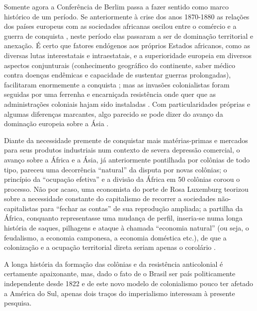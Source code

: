 Somente agora a Conferência de Berlim passa a fazer sentido como marco histórico de um período. Se anteriormente à crise dos anos 1870-1880 as relações dos países europeus com as sociedades africanas oscilou entre o comércio e a guerra de conquista \cite{ogot_hisaf5_2010,AJAYI2010}, neste período elas passaram a ser de dominação territorial e anexação. É certo que fatores endógenos aos próprios Estados africanos, como as diversas lutas interestatais e intraestatais, e a superioridade europeia em diversos aspectos conjunturais (conhecimento geográfico do continente, saber médico contra doenças endêmicas e capacidade de sustentar guerras prolongadas), facilitaram enormemente a conquista \cite{uzoigwe_partilha_2010}; mas as invasões colonialistas foram seguidas por uma ferrenha e encarniçada resistência onde quer que as administrações coloniais hajam sido instaladas \cite[p.~51-318]{boahen_hisaf7_2010}. Com particularidades próprias e algumas diferenças marcantes, algo parecido se pode dizer do avanço da dominação europeia sobre a Ásia \cite{panikkar_domasia_1977}. 

Diante da necessidade premente de conquistar mais matérias-primas e mercados para seus produtos industriais num contexto de severa depressão comercial, o avanço sobre a África e a Ásia, já anteriormente pontilhada por colônias de todo tipo, pareceu uma decorrência ``natural'' da disputa por novas colônias; o princípio da ``ocupação efetiva'' e a divisão da África em 50 colônias coroou o processo. Não por acaso, uma economista do porte de Rosa Luxemburg teorizou sobre a necessidade constante do capitalismo de recorrer a sociedades não-capitalistas para ``fechar as contas'' de sua reprodução ampliada; a partilha da África, conquanto representasse uma mudança de perfil, inseria-se numa longa história de saques, pilhagens e ataque à chamada ``economia natural'' (ou seja, o feudalismo, a economia camponesa, a economia doméstica etc.), de que a colonização e a ocupação territorial direta seriam apenas o corolário \cite{luxemburg_acumula_1985}.

A longa história da formação das colônias e da resistência anticolonial é certamente apaixonante, mas, dado o fato de o Brasil ser país politicamente independente desde 1822 e de este novo modelo de colonialismo pouco ter afetado a América do Sul, apenas dois traços do imperialismo interessam à presente pesquisa.

